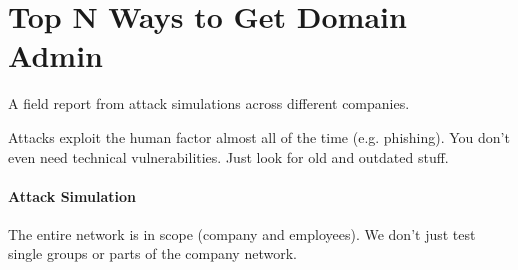 \section{Top N Ways to Get Domain Admin}

A field report from attack simulations across different companies.

Attacks exploit the human factor almost all of the time (e.g. phishing). You don't even need technical vulnerabilities. Just look for old and outdated stuff.

\paragraph{Attack Simulation}
The entire network is in scope (company and employees). We don't just test single groups or parts of the company network.